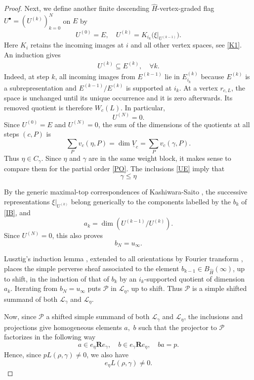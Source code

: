 \documentclass[11pt,reqno]{amsart}
\theoremstyle{definition}
\theoremstyle{remark}
\def\bR{\mathbf R}
\begin{document}
\begin{proof}
Next, we define another  finite descending
$\widehat H$-vertex-graded flag $U^\bullet=(U^{(k)})_{k=0}^N$ on $E$ by
\[
 U^{(0)}=E,\quad
 U^{(k)}=K_{i_k}\bigl(\xi|_{U^{(k-1)}}\bigr).
\]
Here $K_i$ retains the incoming images at $i$ and all other vertex spaces, see \eqref{K1}. 
An induction gives 
\begin{align}\label{UE}U^{(k)}\subseteq E^{(k)},\quad\forall k.\end{align}
Indeed, at step $k$,
all incoming images from $E^{(k-1)}$ lie in $E^{(k)}_{i_k}$ because
$E^{(k)}$ is a subrepresentation and $E^{(k-1)}/E^{(k)}$ is supported at $i_k$.  At a vertex $r_{c,L}$, the space is unchanged
until its unique occurrence and it is zero afterwards. Its removed quotient is therefore  $W_c(L)$.
In particular,  $$U^{(N)}=0.$$
Since \(U^{(0)}=E\) and \(U^{(N)}=0\), the sum of the dimensions of the quotients at all steps \((c,P)\) is
\[
\sum_P v_c(\eta,P)=\dim\underline V_c
=\sum_P v_c(\gamma,P).
\]
Thus \(\eta\in C_\gamma\).
Since $\eta$ and $\gamma$ are in the same weight block, it makes sense to compare them for the partial order \eqref{PO}.
The inclusions \eqref{UE} imply that
$$\gamma\leqslant\eta$$

By the generic maximal-top correspondences of Kashiwara-Saito
\cite[Lem.~5.2.3, Prop.~5.2.4, Thm.~5.3.2]{KS97}, the successive
representations $\xi|_{U^{(k)}}$ belong generically to the components
labelled by the $b_k$ of \eqref{IB}, and
\[
 a_k=\dim(U^{(k-1)}/U^{(k)}).
\]
Since $U^{(N)}=0$, this also proves $$b_N=u_\infty.$$

Lusztig's induction lemma \cite[Lem.~6.4]{Lus91}, extended to all
orientations by Fourier transform \cite[\S5]{Lus91}, places the simple perverse sheaf associated to the element
$b_{k-1}\in B_{\widehat H}(\infty)$, up to shift, in the induction of that of $b_k$ by an
$i_k$-supported quotient of dimension $a_k$. Iterating from
$b_N=u_\infty$ puts $\mathcal P$ in $\mathscr L_\eta$, up to shift.
Thus $\mathcal P$ is a simple shifted summand of both
\(\mathscr L_\gamma\) and \(\mathscr L_\eta\).

Now, since $\mathcal P$ a shifted simple summand  of both $\mathscr L_\gamma$
and $\mathscr L_\eta$, the inclusions and projections
give homogeneous elements $a,$ $b$ such that the projector to $\mathcal P$ factorizes in the following way
\[
 a\in e_\eta\bR e_\gamma,\quad
 b\in e_\gamma\bR e_\eta,\quad ba=p.
\]
Hence, since $p L(\rho,\gamma)\ne0$, we also have  
$$e_\eta L(\rho,\gamma)\ne0.$$



\end{proof}
\end{document}
